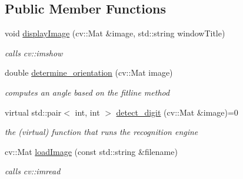 \subsection*{Public Member Functions}
\begin{DoxyCompactItemize}
\item 
\mbox{\label{class_character___recognition___algorithm_ae6fbf353044a0d3d1c4703bff3a46080}} 
void \mbox{\hyperlink{class_character___recognition___algorithm_ae6fbf353044a0d3d1c4703bff3a46080}{display\+Image}} (cv\+::\+Mat \&image, std\+::string window\+Title)
\begin{DoxyCompactList}\small\item\em calls cv\+::imshow \end{DoxyCompactList}\item 
\mbox{\label{class_character___recognition___algorithm_ae82193efbeb4c590439d07669c8f3dc2}} 
double \mbox{\hyperlink{class_character___recognition___algorithm_ae82193efbeb4c590439d07669c8f3dc2}{determine\+\_\+orientation}} (cv\+::\+Mat image)
\begin{DoxyCompactList}\small\item\em computes an angle based on the fitline method \end{DoxyCompactList}\item 
\mbox{\label{class_character___recognition___algorithm_a94b5e41f908d351eaa81d9cf36b0d9cc}} 
virtual std\+::pair$<$ int, int $>$ \mbox{\hyperlink{class_character___recognition___algorithm_a94b5e41f908d351eaa81d9cf36b0d9cc}{detect\+\_\+digit}} (cv\+::\+Mat \&image)=0
\begin{DoxyCompactList}\small\item\em the (virtual) function that runs the recognition engine \end{DoxyCompactList}\item 
\mbox{\label{class_character___recognition___algorithm_ad7302516bfe29b94dd6787cfb4aa9183}} 
cv\+::\+Mat \mbox{\hyperlink{class_character___recognition___algorithm_ad7302516bfe29b94dd6787cfb4aa9183}{load\+Image}} (const std\+::string \&filename)
\begin{DoxyCompactList}\small\item\em calls cv\+::imread \end{DoxyCompactList}\item 

\end{DoxyCompactItemize}
